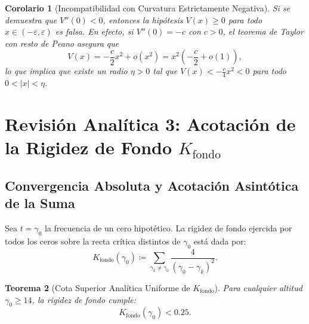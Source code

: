 \documentclass[11pt,a4paper]{article}
\newtheorem{theorem}{Teorema}[section]
\newtheorem{corollary}[theorem]{Corolario}
\theoremstyle{definition}
\theoremstyle{remark}
\begin{document}
\begin{corollary}[Incompatibilidad con Curvatura Estrictamente Negativa]
Si se demuestra que $V''(0) < 0$, entonces la hipótesis $V(x) \ge 0$ para todo $x \in (-\varepsilon, \varepsilon)$ es falsa. En efecto, si $V''(0) = -c$ con $c > 0$, el teorema de Taylor con resto de Peano asegura que
\begin{equation}
V(x) = -\frac{c}{2} x^2 + o(x^2) = x^2 \left( -\frac{c}{2} + o(1) \right),
\end{equation}
lo que implica que existe un radio $\eta > 0$ tal que $V(x) < -\frac{c}{4} x^2 < 0$ para todo $0 < |x| < \eta$.
\end{corollary}

\section{Revisión Analítica 3: Acotación de la Rigidez de Fondo \texorpdfstring{$K_{\text{fondo}}$}{K fondo}}

\subsection{Convergencia Absoluta y Acotación Asintótica de la Suma}

Sea $t = \gamma_0$ la frecuencia de un cero hipotético. La rigidez de fondo ejercida por todos los ceros sobre la recta crítica distintos de $\gamma_0$ está dada por:
\begin{equation}
K_{\text{fondo}}(\gamma_0) \coloneqq \sum_{\gamma_k \neq \gamma_0} \frac{4}{(\gamma_0 - \gamma_k)^2}.
\end{equation}

\begin{theorem}[Cota Superior Analítica Uniforme de $K_{\text{fondo}}$]
Para cualquier altitud $\gamma_0 \ge 14$, la rigidez de fondo cumple:
\begin{equation}
K_{\text{fondo}}(\gamma_0) < 0.25.
\end{equation}
\end{theorem}
\end{document}
